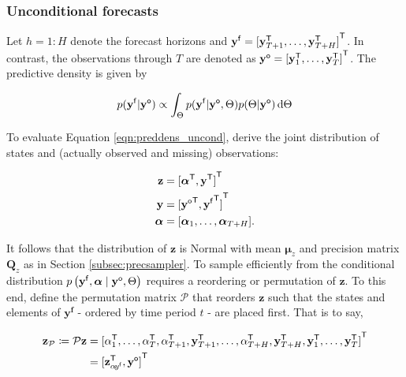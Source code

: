 \documentclass[notitlepage,a4paper,12pt]{article}
\newcommand{\transpose}[1]{{#1}^{\sf{T}}}
\begin{document}
\subsubsection{Unconditional forecasts}\label{sec:uncondfcast}

Let $h = 1:H$ denote the forecast horizons and $\mathbf{y}^{\sf{f}} = \transpose{[\mathbf{y}^{\sf{T}}_{T+1}, \dots, \mathbf{y}^{\sf{T}}_{T+H}]}$. In contrast, the observations through $T$ are denoted as $\mathbf{y}^{\sf{o}} = \transpose{[\mathbf{y}^{\sf{T}}_{1}, \dots, \mathbf{y}^{\sf{T}}_{T}]}$. The predictive density is given by

\begin{equation}\label{eqn:preddens_uncond}
p(\mathbf{y^{\sf{f}}}|\mathbf{y^{\sf{o}}}) \propto \int_{\Theta} p(\mathbf{y^{\sf{f}}}|\mathbf{y^{\sf{o}}}, \Theta) p(\Theta|\mathbf{y^{\sf{o}}})\, \text{d}\Theta
\end{equation}

To evaluate Equation \ref{eqn:preddens_uncond}, derive the joint distribution of states and (actually observed and missing) observations: 

\begin{align*}
    \mathbf{z} &= \transpose{[\transpose{\boldsymbol{\alpha}}, \transpose{\mathbf{y}}]} \\
    \mathbf{y} &= \transpose{[\transpose{\mathbf{y}^{\sf{o}}}, \transpose{\mathbf{y}^{\sf{f}}}]} \\
    \boldsymbol{\alpha} &= [\boldsymbol{\alpha}_1, \dots, \boldsymbol{\alpha}_{T+H}].
\end{align*}

It follows that the distribution of $\mathbf{z}$ is Normal with mean $\boldsymbol{\mu}_{z}$ and precision matrix $\mathbf{Q}_{z}$ as in Section \ref{subsec:precsampler}. To sample efficiently from the conditional distribution $p\left(\mathbf{y}^{\sf{f}}, \boldsymbol{\alpha} \mid \mathbf{y}^{\sf{o}}, \Theta \right)$  requires a reordering or permutation of $\mathbf{z}$. To this end, define the permutation matrix $\mathcal{P}$ that reorders $\mathbf{z}$ such that the states and elements of $\mathbf{y^f}$ - ordered by time period $t$ - are placed first. That is to say,

\begin{align*}
\mathbf{z_{\mathcal{P}}} \coloneqq \mathcal{P} \mathbf{z} 
&=
 \transpose{[
     \alpha^{\sf{T}}_1, 
     \dots, 
     \alpha^{\sf{T}}_T, 
     \alpha^{\sf{T}}_{T+1}, 
     \mathbf{y}^{\sf{T}}_{T+1}, 
     \dots, 
     \alpha^{\sf{T}}_{T+H}, 
     \mathbf{y}^{\sf{T}}_{T+H},
     \mathbf{y}^{\sf{T}}_1,
     \dots,
     \mathbf{y}^{\sf{T}}_T]}\\
&= \transpose{[\mathbf{z}^{\sf{T}}_{\alpha\! y^{\sf{f}}}, \mathbf{y}^{\sf{o}}]}
\end{align*}
\end{document}
